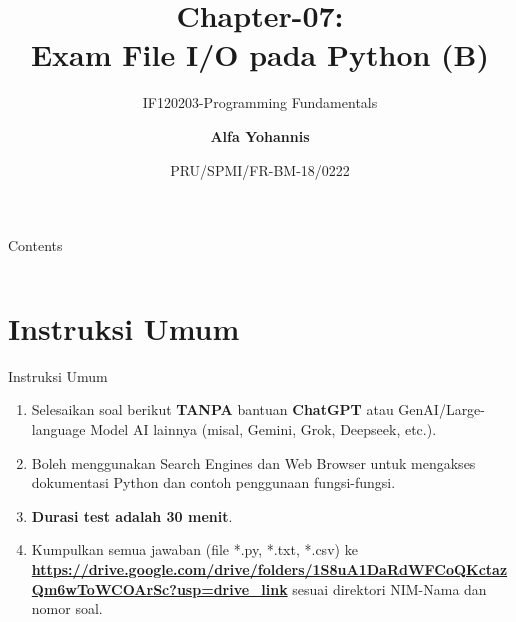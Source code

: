 \documentclass[aspectratio=169, table]{beamer}
\subtitle{IF120203-Programming Fundamentals}
\title{Chapter-07:\\\LARGE{Exam File I/O pada Python (B)\\}
\vspace{10pt}}
\date[Serial]{\scriptsize {PRU/SPMI/FR-BM-18/0222}}
\author[Pradita]{\small{\textbf{Alfa Yohannis}}}
\begin{document}
\frame{\titlepage}

\begin{frame}[fragile]{Contents}
\vspace{15pt}
\begin{columns}[t]
\begin{column}{.4\textwidth}
\tableofcontents[sections={1-4}]
\end{column}
\begin{column}{.6\textwidth}
\tableofcontents[sections={5-7}]
\end{column}
\end{columns}
\end{frame}

\section{Instruksi Umum}
\begin{frame}[fragile]{Instruksi Umum}
\begin{enumerate}
\item Selesaikan soal berikut \textbf{TANPA} bantuan \textbf{ChatGPT} atau GenAI/Large-language Model AI lainnya (misal, Gemini, Grok, Deepseek, etc.).
\item Boleh menggunakan Search Engines dan Web Browser untuk mengakses dokumentasi Python dan contoh penggunaan fungsi-fungsi.
\item \textbf{Durasi test adalah 30 menit}.
\item Kumpulkan semua jawaban (file *.py, *.txt, *.csv) ke \textcolor{blue}{\textbf{\url{https://drive.google.com/drive/folders/1S8uA1DaRdWFCoQKctazQm6wToWCOArSc?usp=drive_link}}} sesuai direktori NIM-Nama dan nomor soal.
\end{enumerate}
\end{frame}
\end{document}

